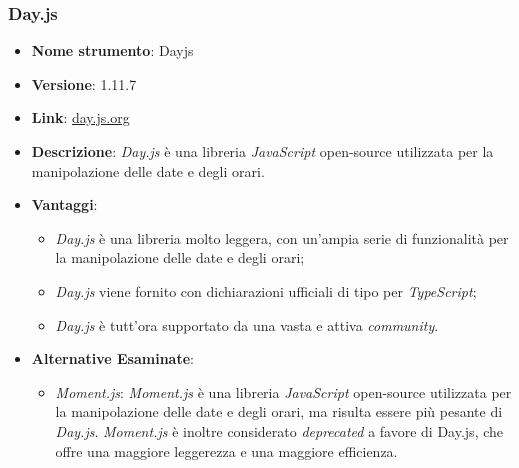 \subsubsection{Day.js}
\begin{itemize}
      \item \textbf{Nome strumento}: Dayjs
      \item \textbf{Versione}: 1.11.7
      \item \textbf{Link}: \href{https://day.js.org/}{day.js.org}
      \item \textbf{Descrizione}: \textit{Day.js} è una libreria \textit{JavaScript} open-source utilizzata per la manipolazione delle date e degli orari.
      \item \textbf{Vantaggi}:
            \begin{itemize}
                  \item \textit{Day.js} è una libreria molto leggera, con un'ampia serie di funzionalità per la manipolazione delle date e degli orari;
                  \item \textit{Day.js} viene fornito con dichiarazioni ufficiali di tipo per \textit{TypeScript};
                  \item \textit{Day.js} è tutt'ora supportato da una vasta e attiva \textit{community}.
            \end{itemize}
      \item \textbf{Alternative Esaminate}:
            \begin{itemize}
                  \item \textit{Moment.js}: \textit{Moment.js} è una libreria \textit{JavaScript} open-source utilizzata per la manipolazione delle date e degli orari, ma risulta essere più pesante
                        di \textit{Day.js}. \textit{Moment.js} è inoltre considerato \textit{deprecated} a favore di Day.js, che offre una maggiore leggerezza e una maggiore efficienza.
            \end{itemize}
\end{itemize}

